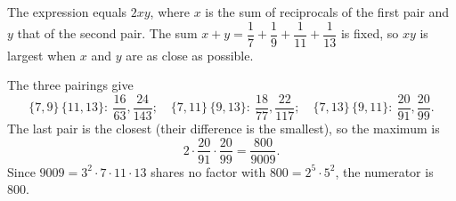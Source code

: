 The expression equals $2xy$, where $x$ is the sum of reciprocals of the first pair and $y$ that of the second pair. The sum $x+y=\dfrac17+\dfrac19+\dfrac1{11}+\dfrac1{13}$ is fixed, so $xy$ is largest when $x$ and $y$ are as close as possible.

The three pairings give
\[\{7,9\}\,\{11,13\}:\ \dfrac{16}{63},\dfrac{24}{143};\quad \{7,11\}\,\{9,13\}:\ \dfrac{18}{77},\dfrac{22}{117};\quad \{7,13\}\,\{9,11\}:\ \dfrac{20}{91},\dfrac{20}{99}.\]
The last pair is the closest (their difference is the smallest), so the maximum is
\[2\cdot\dfrac{20}{91}\cdot\dfrac{20}{99}=\dfrac{800}{9009}.\]
Since $9009=3^2\cdot7\cdot11\cdot13$ shares no factor with $800=2^5\cdot5^2$, the numerator is $\boxed{800}$.
